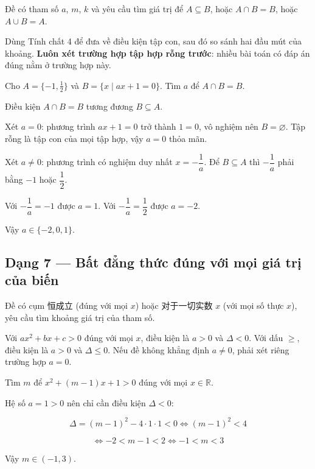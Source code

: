 \documentclass[11pt, a4paper]{article}
\begin{document}
 Đề có tham số $a$, $m$, $k$ và yêu cầu tìm giá trị để $A \subseteq B$, hoặc $A \cap B = B$, hoặc $A \cup B = A$.

 Dùng Tính chất 4 để đưa về điều kiện tập con, sau đó so sánh hai đầu mút của khoảng. \textbf{Luôn xét trường hợp tập hợp rỗng trước}: nhiều bài toán có đáp án đúng nằm ở trường hợp này.

\begin{vidu}[{6}]
Cho $A = \{-1, \tfrac{1}{2}\}$ và $B = \{x \mid ax + 1 = 0\}$. Tìm $a$ để $A \cap B = B$.

Điều kiện $A \cap B = B$ tương đương $B \subseteq A$.

Xét $a = 0$: phương trình $ax + 1 = 0$ trở thành $1 = 0$, vô nghiệm nên $B = \varnothing$. Tập rỗng là tập con của mọi tập hợp, vậy $a = 0$ thỏa mãn.

Xét $a \neq 0$: phương trình có nghiệm duy nhất $x = -\dfrac{1}{a}$. Để $B \subseteq A$ thì $-\dfrac{1}{a}$ phải bằng $-1$ hoặc $\dfrac{1}{2}$.

Với $-\dfrac{1}{a} = -1$ được $a = 1$. Với $-\dfrac{1}{a} = \dfrac{1}{2}$ được $a = -2$.

Vậy $a \in \{-2, 0, 1\}$.

\end{vidu}
\subsection{Dạng 7 — Bất đẳng thức đúng với mọi giá trị của biến}

 Đề có cụm 恒成立 (đúng với mọi $x$) hoặc 对于一切实数 $x$ (với mọi số thực $x$), yêu cầu tìm khoảng giá trị của tham số.

 Với $ax^2 + bx + c > 0$ đúng với mọi $x$, điều kiện là $a > 0$ và $\Delta < 0$. Với dấu $\ge$, điều kiện là $a > 0$ và $\Delta \le 0$. Nếu đề không khẳng định $a \neq 0$, phải xét riêng trường hợp $a = 0$.

\begin{vidu}[{7}]
Tìm $m$ để $x^2 + (m - 1)x + 1 > 0$ đúng với mọi $x \in \mathbb{R}$.

Hệ số $a = 1 > 0$ nên chỉ cần điều kiện $\Delta < 0$:

$$\Delta = (m-1)^2 - 4 \cdot 1 \cdot 1 < 0 \iff (m-1)^2 < 4$$

$$\iff -2 < m - 1 < 2 \iff -1 < m < 3$$

Vậy $m \in (-1, 3)$.

\end{vidu}
\end{document}

